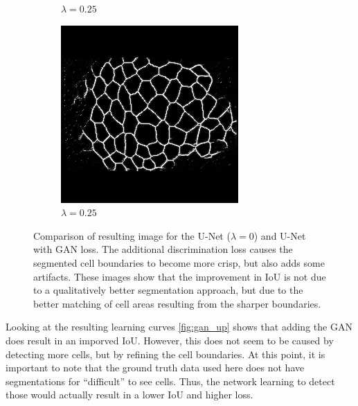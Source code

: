 \documentclass[aps,prl,twocolumn,groupedaddress,amsmath,amssymb]{revtex4-1}
\begin{document}
\begin{figure}[tbp]
\begin{subfigure}[c]{0.45\linewidth}
            \caption{$\lambda=0.25$}
        \end{subfigure}%
        \begin{subfigure}[c]{0.45\linewidth}
            \includegraphics[width=\linewidth]{figures/27-33.png}
            \caption{$\lambda=0.25$}
        \end{subfigure}
        \caption{Comparison of resulting image for the U-Net ($\lambda=0$) and U-Net with GAN loss.
         The additional discrimination loss causes the segmented cell boundaries
        to become more crisp, but also adds some artifacts. These images show that the improvement 
        in IoU is not due to a qualitatively better segmentation approach, but due to the better 
        matching of cell areas resulting from the sharper boundaries.}
        \label{fig:unet_vs_ganunet}
    \end{figure}

    Looking at the resulting learning curves \autoref{fig:gan_up} shows that
    adding the GAN does result in an imporved IoU. However, this does not seem
    to be caused by detecting more cells, but by refining the cell boundaries.
    At this point, it is important to note that the ground truth data used
    here does not have segmentations for ``difficult'' to see cells. Thus, the
    network learning to detect those would actually result in a lower IoU and
    higher loss.
\end{document}

